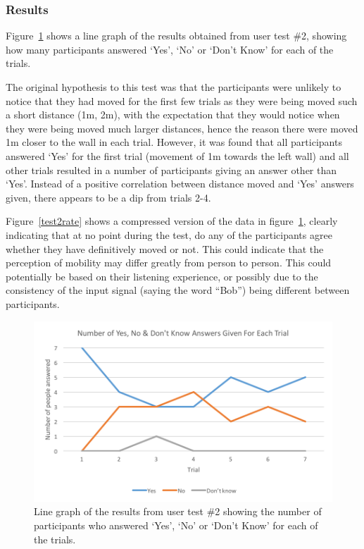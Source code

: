\documentclass[../../main.tex]{subfiles}
\begin{document}
			\subsubsection{Results}

				Figure~\ref{test2results} shows a line graph of the results obtained from user test \#2, showing how many participants answered `Yes', `No' or `Don't Know' for each of the trials.

				The original hypothesis to this test was that the participants were unlikely to notice that they had moved for the first few trials as they were being moved such a short distance (1m, 2m), with the expectation that they would notice when they were being moved much larger distances, hence the reason there were moved 1m closer to the wall in each trial. However, it was found that all participants answered `Yes' for the first trial (movement of 1m towards the left wall) and all other trials resulted in a number of participants giving an answer other than `Yes'. Instead of a positive correlation between distance moved and `Yes' answers given, there appears to be a dip from trials 2-4.

				Figure~\ref{test2rate} shows a compressed version of the data in figure~\ref{test2results}, clearly indicating that at no point during the test, do any of the participants agree whether they have definitively moved or not. This could indicate that the perception of mobility may differ greatly from person to person. This could potentially be based on their listening experience, or possibly due to the consistency of the input signal (saying the word ``Bob'') being different between participants.

				\begin{figure}
					\centerline{\includegraphics[scale = 1]{Sections/userTesting/images/test2/Q2_edit.png}}
					\caption{Line graph of the results from user test \#2 showing the number of participants who answered `Yes', `No' or `Don't Know' for each of the trials.}
					\label{test2results}
				\end{figure}
\end{document}
